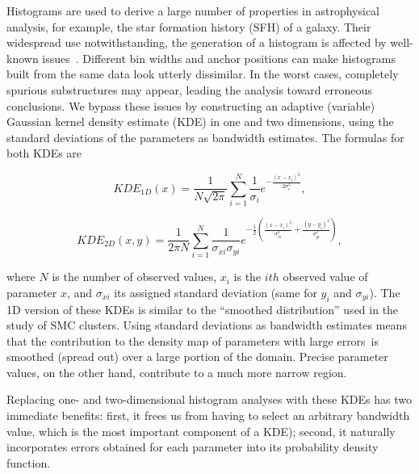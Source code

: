 \documentclass{aa}
\begin{document}
Histograms are used to derive a large number of properties in astrophysical
analysis, for example, the star formation history (SFH) of a galaxy.
%
Their widespread use notwithstanding, the generation of a histogram is affected
by well-known issues~\citep[see][]{Silverman_1986,Simonoff_1997}.
Different bin widths and anchor positions can make histograms built from the
same data look utterly dissimilar. In the worst cases, completely spurious
substructures may appear, leading the analysis toward erroneous conclusions.
%
We bypass these issues by constructing an adaptive (variable) Gaussian kernel
density estimate (KDE) in one and two dimensions, using the standard
deviations of the parameters as bandwidth estimates. The formulas for both KDEs are

\begin{equation}
KDE_{1D}(x) = \frac{1}{N\sqrt{2\pi}} \sum_{i=1}^N \frac{1}{\sigma_i}
e^{-\frac{(x-x_i)^2}{2\sigma_i^2}},
\label{eq:kde-1d}
\end{equation}

\begin{equation}
KDE_{2D}(x,y) = \frac{1}{2\pi N} \sum_{i=1}^N \frac{1}{\sigma_{xi}\sigma_{yi}}
e^{-\frac{1}{2} \left( \frac{(x-x_i)^2}{\sigma_{xi}^2} + 
\frac{(y-y_i)^2}{\sigma_{yi}^2} \right)},
\label{eq:kde-2d}
\end{equation}

\noindent where $N$ is the number of observed values, $x_i$ is the $ith$
observed value of parameter $x$, and $\sigma_{xi}$ its assigned standard
deviation (same for $y_i$ and $\sigma_{yi}$). The 1D version of these KDEs is
similar to the ``smoothed distribution'' used in the~\cite{Rafelski_2005} study
of SMC clusters.
%
Using standard deviations as bandwidth estimates means that the contribution to
the density map of parameters with large errors\ is smoothed (spread out) over
a large portion of the domain. Precise parameter values, on the other
hand, contribute to a much more narrow region.

Replacing one- and two-dimensional histogram analyses with these KDEs has two
immediate benefits: first, it frees us from having to select an arbitrary bandwidth
value, which is the most important component of a KDE);  second, it naturally incorporates
errors obtained for each parameter into its probability density function.
%
\end{document}
